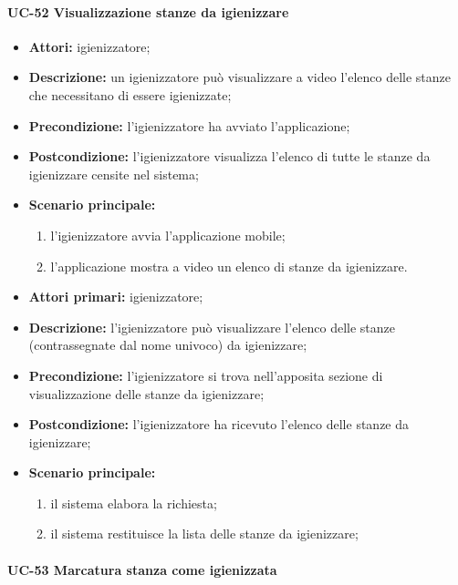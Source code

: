 \paragraph{UC-52 Visualizzazione stanze da igienizzare}
\begin{itemize}
    \item \textbf{Attori:} igienizzatore;
    \item \textbf{Descrizione:} un igienizzatore pu\`{o} visualizzare a video l'elenco delle stanze che necessitano di essere igienizzate;
    \item \textbf{Precondizione:} l'igienizzatore ha avviato l'applicazione;
    \item \textbf{Postcondizione:} l'igienizzatore visualizza l'elenco di tutte le stanze da igienizzare censite nel sistema;
    \item \textbf{Scenario principale:}
    \begin{enumerate}
        \item l'igienizzatore avvia l'applicazione mobile;
        \item l'applicazione mostra a video un elenco di stanze da igienizzare.
    \end{enumerate}
\end{itemize}

    \begin{itemize}
        \item \textbf{Attori primari:} igienizzatore;
        \item \textbf{Descrizione:} l’igienizzatore può visualizzare l'elenco delle stanze (contrassegnate dal nome univoco) da igienizzare;
        \item \textbf{Precondizione:} l'igienizzatore si trova nell’apposita sezione di visualizzazione delle stanze da igienizzare; 
        \item \textbf{Postcondizione:} l'igienizzatore ha ricevuto l'elenco delle stanze da igienizzare;
        \item \textbf{Scenario principale:} 
            \begin{enumerate}
                \item il sistema elabora la richiesta;
                \item il sistema restituisce la lista delle stanze da igienizzare;
            \end{enumerate}
    \end{itemize}
\paragraph{UC-53 Marcatura stanza come igienizzata}

